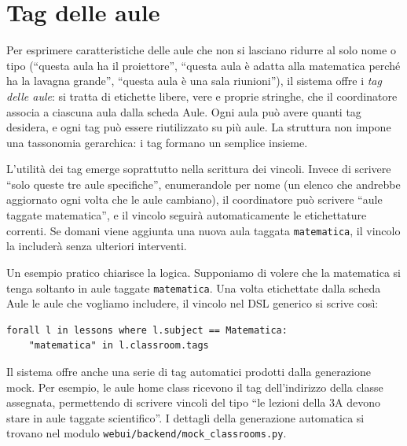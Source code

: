 \section{Tag delle aule}

Per esprimere caratteristiche delle aule che non si lasciano
ridurre al solo nome o tipo (``questa aula ha il
proiettore'', ``questa aula \`e adatta alla matematica
perch\'e ha la lavagna grande'', ``questa aula \`e una sala
riunioni''), il sistema offre i \emph{tag delle aule}: si
tratta di etichette libere, vere e proprie stringhe, che il
coordinatore associa a ciascuna aula dalla scheda Aule.
Ogni aula pu\`o avere quanti tag desidera, e ogni tag pu\`o
essere riutilizzato su pi\`u aule. La struttura non impone
una tassonomia gerarchica: i tag formano un semplice
insieme.

L'utilit\`a dei tag emerge soprattutto nella scrittura dei
vincoli. Invece di scrivere ``solo queste tre aule
specifiche'', enumerandole per nome (un elenco che andrebbe
aggiornato ogni volta che le aule cambiano), il coordinatore
pu\`o scrivere ``aule taggate matematica'', e il vincolo
seguir\`a automaticamente le etichettature correnti. Se
domani viene aggiunta una nuova aula taggata
\texttt{matematica}, il vincolo la includer\`a senza
ulteriori interventi.

Un esempio pratico chiarisce la logica. Supponiamo di
volere che la matematica si tenga soltanto in aule taggate
\texttt{matematica}. Una volta etichettate dalla scheda
Aule le aule che vogliamo includere, il vincolo nel DSL
generico si scrive cos\`i:

\begin{lstlisting}
forall l in lessons where l.subject == Matematica:
    "matematica" in l.classroom.tags
\end{lstlisting}

Il sistema offre anche una serie di tag automatici prodotti
dalla generazione mock. Per esempio, le aule home class
ricevono il tag dell'indirizzo della classe assegnata,
permettendo di scrivere vincoli del tipo ``le lezioni della
3A devono stare in aule taggate scientifico''. I dettagli
della generazione automatica si trovano nel modulo
\texttt{webui/backend/mock\_classrooms.py}.



